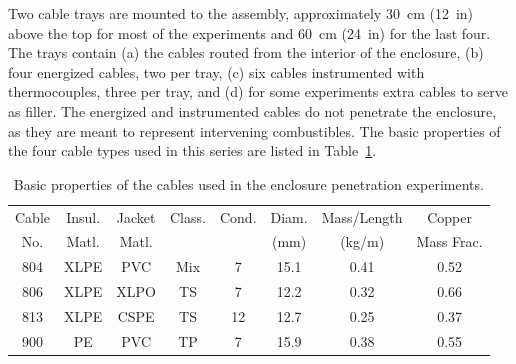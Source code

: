 Two cable trays are mounted to the assembly, approximately 30~cm (12~in) above the top for most of the experiments and 60~cm (24~in) for the last four. The trays contain (a) the cables routed from the interior of the enclosure, (b) four energized cables, two per tray, (c) six cables instrumented with thermocouples, three per tray, and (d) for some experiments extra cables to serve as filler. The energized and instrumented cables do not penetrate the enclosure, as they are meant to represent intervening combustibles. The basic properties of the four cable types used in this series are listed in Table~\ref{cables}.

\begin{table}[ht]
\centering
\caption[Cable Properties]{Basic properties of the cables used in the enclosure penetration experiments.}
\label{cables}
\begin{tabular}{|c|c|c|c|c|c|c|c|}
\hline
Cable & Insul.  & Jacket  & Class.  & Cond.  & Diam.  & Mass/Length & Copper     \\
No.   & Matl.   & Matl.   &         &        & (mm)   & (kg/m)      & Mass Frac. \\ \hline
804   & XLPE    & PVC     & Mix     & 7      & 15.1   & 0.41        & 0.52       \\ \hline
806   & XLPE    & XLPO    & TS      & 7      & 12.2   & 0.32        & 0.66       \\ \hline
813   & XLPE    & CSPE    & TS      & 12     & 12.7   & 0.25        & 0.37       \\ \hline
900   & PE      & PVC     & TP      & 7      & 15.9   & 0.38        & 0.55       \\ \hline
\end{tabular}
\end{table}

